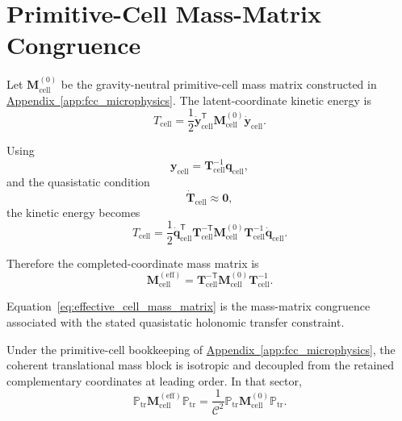 \section{Primitive-Cell Mass-Matrix Congruence}
\label{sec:grav_mass_matrix_congruence}

Let $\mathbf{M}_{\mathrm{cell}}^{(0)}$ be the gravity-neutral primitive-cell mass matrix constructed in \hyperref[app:fcc_microphysics]{Appendix~\ref*{app:fcc_microphysics}}. The latent-coordinate kinetic energy is
\begin{equation}
    T_{\mathrm{cell}} = \frac{1}{2} \dot{\mathbf{y}}_{\mathrm{cell}}^{\mathsf{T}} \mathbf{M}_{\mathrm{cell}}^{(0)} \dot{\mathbf{y}}_{\mathrm{cell}}.
\end{equation}

Using
\begin{equation}
    \mathbf{y}_{\mathrm{cell}} = \mathbf{T}_{\mathrm{cell}}^{-1} \mathbf{q}_{\mathrm{cell}},
\end{equation}
and the quasistatic condition
\begin{equation}
    \dot{\mathbf{T}}_{\mathrm{cell}} \approx \mathbf{0},
\end{equation}
the kinetic energy becomes
\begin{equation}
    T_{\mathrm{cell}} = \frac{1}{2} \dot{\mathbf{q}}_{\mathrm{cell}}^{\mathsf{T}} \mathbf{T}_{\mathrm{cell}}^{-\mathsf{T}} \mathbf{M}_{\mathrm{cell}}^{(0)} \mathbf{T}_{\mathrm{cell}}^{-1} \dot{\mathbf{q}}_{\mathrm{cell}}.
\end{equation}

Therefore the completed-coordinate mass matrix is
\begin{equation}
    \mathbf{M}_{\mathrm{cell}}^{(\mathrm{eff})} = \mathbf{T}_{\mathrm{cell}}^{-\mathsf{T}} \mathbf{M}_{\mathrm{cell}}^{(0)} \mathbf{T}_{\mathrm{cell}}^{-1}.
    \label{eq:effective_cell_mass_matrix}
\end{equation}

Equation~\eqref{eq:effective_cell_mass_matrix} is the mass-matrix congruence associated with the stated quasistatic holonomic transfer constraint.

Under the primitive-cell bookkeeping of \hyperref[app:fcc_microphysics]{Appendix~\ref*{app:fcc_microphysics}}, the coherent translational mass block is isotropic and decoupled from the retained complementary coordinates at leading order. In that sector,
\begin{equation}
    \mathbb{P}_{\mathrm{tr}} \mathbf{M}_{\mathrm{cell}}^{(\mathrm{eff})} \mathbb{P}_{\mathrm{tr}} = \frac{1}{\mathcal{C}^2} \mathbb{P}_{\mathrm{tr}} \mathbf{M}_{\mathrm{cell}}^{(0)} \mathbb{P}_{\mathrm{tr}}.
    \label{eq:projected_mass_scaling}
\end{equation}

